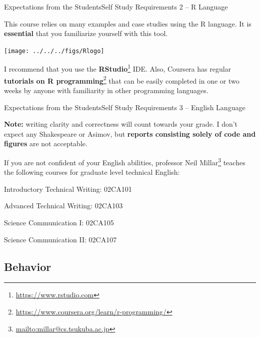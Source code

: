 \documentclass[t]{beamer}
\begin{document}
\begin{ftst}
  {Expectations from the Students}{Self Study Requirements 2 -- R Language}

  This course relies on many examples and case studies using the R
  language. It is {\bf essential} that you familiarize yourself with
  this tool.

  \vone

  \begin{center}
    \texttt{[image: ../../../figs/Rlogo]}
  \end{center}
  
  \vone
  
  I recommend that you use the
  {\bf RStudio}\footnote{\url{https://www.rstudio.com}} IDE. Also,
  Coursera has regular {\bf tutorials on R
    programming}\footnote{\url{https://www.coursera.org/learn/r-programming/}}
  that can be easily completed in one or two weeks by anyone with
  familiarity in other programming languages.
  
  
\end{ftst}

\begin{ftst}
  {Expectations from the Students}{Self Study Requirements 3 -- English Language}

  {\bf Note:} writing clarity and correctness will count towards your
  grade. I don't expect any Shakespeare or Asimov, but {\bf reports
    consisting solely of code and figures} are not acceptable.

  \vone
  
  If you are not confident of your English abilities, professor Neil
  Millar\footnote{\url{mailto:millar@cs.tsukuba.ac.jp}} teaches the
  following courses for graduate level technical English:
  
  \vone
  
  \bitems Introductory Technical Writing: 02CA101
\item Advanced Technical Writing: 02CA103
\item Science Communication I: 02CA105
\item Science Communication II: 02CA107
  \eitem

  
\end{ftst}

\subsection{Behavior}
\end{document}
